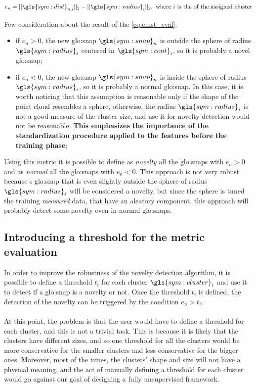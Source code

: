 \begin{equation}
  \label{eq:clust_eval}
  e_{n} = ||\gls{sym:dist}_{n,i}||_2 - ||\gls{sym:radius}_{i}||_2, \text{ where $i$ is the of the assigned cluster}
\end{equation}

Few consideration about the result of the \autoref{eq:clust_eval}:
\begin{itemize}
  \item if $e_{n} > 0$, the new {\gls{glo:snap}} $\gls{sym:snap}_n$ is outside the sphere of radius $\gls{sym:radius}_i$ centered in $\gls{sym:cent}_i$, so it is probably a novel {\gls{glo:snap}};
  \item if $e_{n} < 0$, the new {\gls{glo:snap}} $\gls{sym:snap}_n$ is inside the sphere of radius $\gls{sym:radius}_i$, so it is probably a normal {\gls{glo:snap}}. In this case, it is worth noticing that this assumption is reasonable only if the shape of the point cloud resembles a sphere, otherwise, the radius $\gls{sym:radius}_i$ is not a good measure of the cluster size, and use it for novelty detection would not be reasonable. \textbf{This emphasizes the importance of the standardization procedure applied to the features before the training phase};
\end{itemize}



Using this metric it is possible to define as \emph{novelty} all the {\gls{glo:snap}}s with $e_{n} > 0$ and as \emph{normal} all the {\gls{glo:snap}}s with $e_{n} < 0$. This approach is not very robust because s {\gls{glo:snap}} that is even slightly outside the sphere of radius $\gls{sym:radius}_i$ will be considered a novelty, but since the sphere is tuned the training \emph{measured} data, that have an aleatory component, this approach will probably detect some novelty even in normal {\gls{glo:snap}}s.

\subsection{Introducing a threshold for the metric evaluation}
\label{sec:clust_threshold}
In order to improve the robustness of the novelty detection algorithm, it is possible to define a threshold ${t}_i$ for each cluster $\gls{sym:cluster}_i$ and use it to detect if a {\gls{glo:snap}} is a novelty or not. Once the threshold ${t}_i$ is defined, the detection of the novelty can be triggered by the condition $e_{n} > {t}_i$.

\paragraph*{}
At this point, the problem is that the user would have to define a threshold for each cluster, and this is not a trivial task. This is because it is likely that the clusters have different sizes, and so one threshold for all the clusters would be more conservative for the smaller clusters and less conservative for the bigger ones. Moreover, most of the times, the clusters' shape and size will not have a physical meaning, and the act of manually defining a threshold for each cluster would go against our goal of designing a fully unsupervised framework.


